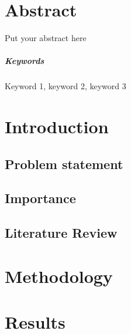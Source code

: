 \documentclass{senior-design}
\begin{document}
\frontmatter
\generalreportcover %

\chapter{Abstract}
Put your abstract here

\paragraph{Keywords}
Keyword 1, keyword 2, keyword 3
\tableofcontents
\mainmatter

\chapter{Introduction}
\section{Problem statement}

\section{Importance}

\section{Literature Review}

\chapter{Methodology}

\chapter{Results}
\end{document}
